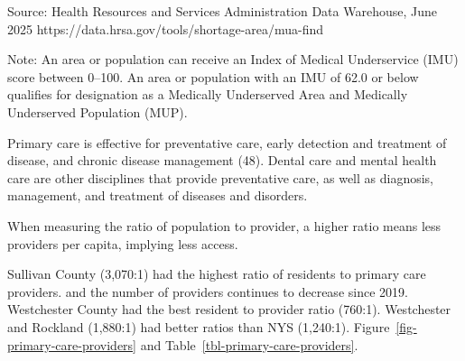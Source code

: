 \documentclass[
  english,
  letterpaper,
]{report}
\begin{document}
\begin{longtable}[]{@{}lllll@{}}
\end{longtable}

\begin{tcolorbox}[enhanced jigsaw, breakable, leftrule=.75mm, title=\textcolor{quarto-callout-note-color}{\faInfo}\hspace{0.5em}{Source}, bottomrule=.15mm, opacityback=0, left=2mm, colback=white, bottomtitle=1mm, coltitle=black, colbacktitle=quarto-callout-note-color!10!white, colframe=quarto-callout-note-color-frame, opacitybacktitle=0.6, toptitle=1mm, titlerule=0mm, arc=.35mm, rightrule=.15mm, toprule=.15mm]

Source: Health Resources and Services Administration Data Warehouse,
June 2025 https://data.hrsa.gov/tools/shortage-area/mua-find

\end{tcolorbox}

\begin{tcolorbox}[enhanced jigsaw, breakable, leftrule=.75mm, title=\textcolor{quarto-callout-note-color}{\faInfo}\hspace{0.5em}{Note}, bottomrule=.15mm, opacityback=0, left=2mm, colback=white, bottomtitle=1mm, coltitle=black, colbacktitle=quarto-callout-note-color!10!white, colframe=quarto-callout-note-color-frame, opacitybacktitle=0.6, toptitle=1mm, titlerule=0mm, arc=.35mm, rightrule=.15mm, toprule=.15mm]

Note: An area or population can receive an Index of Medical Underservice
(IMU) score between 0--100. An area or population with an IMU of 62.0 or
below qualifies for designation as a Medically Underserved Area and
Medically Underserved Population (MUP).

\end{tcolorbox}

Primary care is effective for preventative care, early detection and
treatment of disease, and chronic disease management (48). Dental care
and mental health care are other disciplines that provide preventative
care, as well as diagnosis, management, and treatment of diseases and
disorders.

When measuring the ratio of population to provider, a higher ratio means
less providers per capita, implying less access.

Sullivan County (3,070:1) had the highest ratio of residents to primary
care providers. and the number of providers continues to decrease since
2019. Westchester County had the best resident to provider ratio
(760:1). Westchester and Rockland (1,880:1) had better ratios than NYS
(1,240:1). Figure~\ref{fig-primary-care-providers} and
Table~\ref{tbl-primary-care-providers}.
\end{document}
